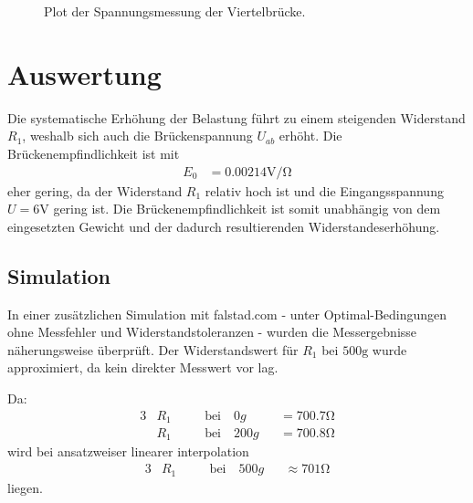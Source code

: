 \begin{figure}[!h]
    \centering
    \caption{Plot der Spannungsmessung der Viertelbrücke.}
    \label{fig:quarter-bridge-voltage-measurement}
\end{figure}

\section[Auswertung]{Auswertung}

Die systematische Erhöhung der Belastung führt zu einem steigenden Widerstand \( R_1 \),
weshalb sich auch die Brückenspannung \( U_{ab} \) erhöht.
Die Brückenempfindlichkeit ist mit
\begin{align}
    E_0 &= 0.00214 \si{\volt\per\ohm}
\end{align}
eher gering, da der Widerstand \( R_1 \) relativ hoch ist
und die Eingangsspannung \( U = 6 \si{\volt} \) gering ist.
Die Brückenempfindlichkeit ist somit unabhängig von dem eingesetzten Gewicht
und der dadurch resultierenden Widerstandeserhöhung.
\subsection[Simulation]{Simulation}
In einer zusätzlichen Simulation mit falstad.com
- unter Optimal-Bedingungen ohne Messfehler und Widerstandstoleranzen -
wurden die Messergebnisse näherungsweise überprüft.
Der Widerstandswert für \( R_1 \) bei \( 500 \si{\gram} \) wurde 
approximiert, da kein direkter Messwert vor lag.

Da:
\begin{alignat*}{3}
    & R_1 \quad &&\text{bei} \quad 0g   &&= 700.7 \si{\ohm} \\
    & R_1 \quad &&\text{bei} \quad 200g &&= 700.8 \si{\ohm}
\end{alignat*}
wird bei ansatzweiser linearer interpolation
\begin{alignat*}{3}
    & R_1 \quad &&\text{bei} \quad 500g &&\approx 701 \si{\ohm}
\end{alignat*}
liegen.

